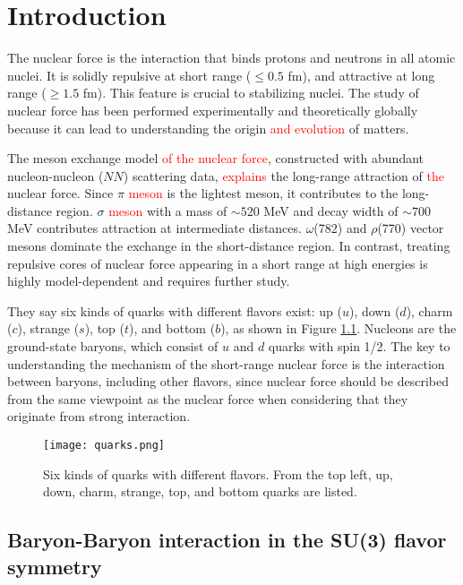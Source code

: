 %
\graphicspath{{./pictures/chapter1/}}

\chapter{Introduction} 
\label{chap1}
The nuclear force is the interaction that binds protons and neutrons in all atomic nuclei. It is solidly repulsive at short range ($\leq0.5$ fm), and attractive at long range ($\geq1.5$ fm). This feature is crucial to stabilizing nuclei. The study of nuclear force has been performed experimentally and theoretically globally because it can lead to understanding the origin \textcolor{red}{and evolution} of matters. 

The meson exchange model \textcolor{red}{of the nuclear force}, constructed with abundant nucleon-nucleon ($NN$) scattering data, \textcolor{red}{explains} the long-range attraction of \textcolor{red}{the} nuclear force. Since $\pi$ \textcolor{red}{meson} is the lightest meson, it contributes to the long-distance region. $\sigma$ \textcolor{red}{meson} with a mass of $\sim520$ MeV and decay width of $\sim700$ MeV contributes attraction at intermediate distances. $\omega$(782) and $\rho$(770) vector mesons dominate the exchange in the short-distance region. In contrast, treating repulsive cores of nuclear force appearing in a short range at high energies is highly model-dependent and requires further study. 

They say six kinds of quarks with different flavors exist: up ($u$), down ($d$), charm ($c$), strange ($s$), top ($t$), and bottom ($b$), as shown in Figure \ref{fig-quarks}. Nucleons are the ground-state baryons, which consist of $u$ and $d$ quarks with spin 1/2. The key to understanding the mechanism of the short-range nuclear force is the interaction between baryons, including other flavors, since nuclear force should be described from the same viewpoint as the nuclear force when considering that they originate from strong interaction. 
\begin{figure}[h!]
  \begin{center}
  \texttt{[image: quarks.png]}
  \caption{Six kinds of quarks with different flavors. From the top left, up, down, charm, strange, top, and bottom quarks are listed.}
  \label{fig-quarks}
  \end{center}
\end{figure}

\section{Baryon-Baryon interaction in the SU(3) flavor symmetry}
\label{sec-BBint}

